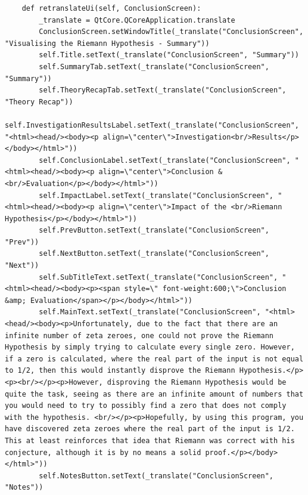 \documentclass[12pt]{article}
\begin{document}
\begin{lstlisting}
    def retranslateUi(self, ConclusionScreen):
        _translate = QtCore.QCoreApplication.translate
        ConclusionScreen.setWindowTitle(_translate("ConclusionScreen", "Visualising the Riemann Hypothesis - Summary"))
        self.Title.setText(_translate("ConclusionScreen", "Summary"))
        self.SummaryTab.setText(_translate("ConclusionScreen", "Summary"))
        self.TheoryRecapTab.setText(_translate("ConclusionScreen", "Theory Recap"))
        self.InvestigationResultsLabel.setText(_translate("ConclusionScreen", "<html><head/><body><p align=\"center\">Investigation<br/>Results</p></body></html>"))
        self.ConclusionLabel.setText(_translate("ConclusionScreen", "<html><head/><body><p align=\"center\">Conclusion & <br/>Evaluation</p></body></html>"))
        self.ImpactLabel.setText(_translate("ConclusionScreen", "<html><head/><body><p align=\"center\">Impact of the <br/>Riemann Hypothesis</p></body></html>"))
        self.PrevButton.setText(_translate("ConclusionScreen", "Prev"))
        self.NextButton.setText(_translate("ConclusionScreen", "Next"))
        self.SubTitleText.setText(_translate("ConclusionScreen", "<html><head/><body><p><span style=\" font-weight:600;\">Conclusion &amp; Evaluation</span></p></body></html>"))
        self.MainText.setText(_translate("ConclusionScreen", "<html><head/><body><p>Unfortunately, due to the fact that there are an infinite number of zeta zeroes, one could not prove the Riemann Hypothesis by simply trying to calculate every single zero. However, if a zero is calculated, where the real part of the input is not equal to 1/2, then this would instantly disprove the Riemann Hypothesis.</p><p><br/></p><p>However, disproving the Riemann Hypothesis would be quite the task, seeing as there are an infinite amount of numbers that you would need to try to possibly find a zero that does not comply with the hypothesis. <br/></p><p>Hopefully, by using this program, you have discovered zeta zeroes where the real part of the input is 1/2. This at least reinforces that idea that Riemann was correct with his conjecture, although it is by no means a solid proof.</p></body></html>"))
        self.NotesButton.setText(_translate("ConclusionScreen", "Notes"))
\end{lstlisting}
\end{document}
